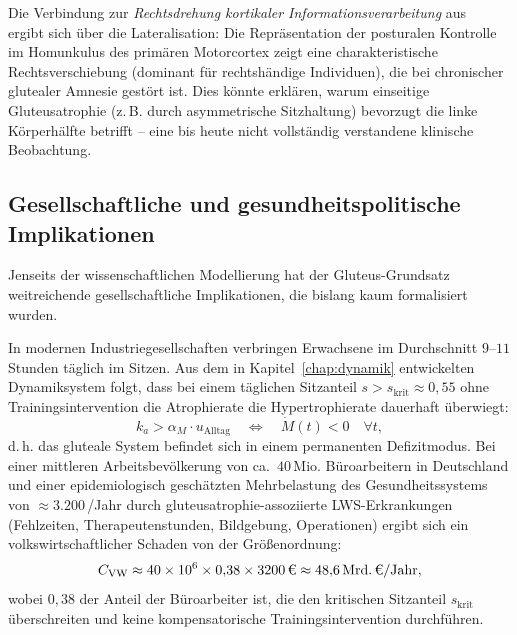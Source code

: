 ﻿\documentclass[12pt,a4paper]{report}
\theoremstyle{plain}
\theoremstyle{definition}
\theoremstyle{remark}
\newcommand{\euro}{\texteuro}    %
\begin{document}
	Die Verbindung zur \emph{Rechtsdrehung kortikaler Informationsverarbeitung}
	aus~\cite{epp2026wolke} ergibt sich über die Lateralisation:
	Die Repräsentation der posturalen Kontrolle im Homunkulus des
	primären Motorcortex zeigt eine charakteristische Rechtsverschiebung
	(dominant für rechtshändige Individuen), die bei chronischer
	glutealer Amnesie gestört ist. Dies könnte erklären, warum
	einseitige Gluteusatrophie (z.\,B. durch asymmetrische Sitzhaltung)
	bevorzugt die linke Körperhälfte betrifft -- eine bis heute nicht
	vollständig verstandene klinische Beobachtung.
	
	\subsection{Gesellschaftliche und gesundheitspolitische Implikationen}
	\label{subsec:gesellschaft}
	
	Jenseits der wissenschaftlichen Modellierung hat der Gluteus-Grundsatz
	weitreichende gesellschaftliche Implikationen, die bislang kaum formalisiert wurden.
	
	In modernen Industriegesellschaften verbringen Erwachsene im Durchschnitt
	$9$--$11$ Stunden täglich im Sitzen. Aus dem in Kapitel~\ref{chap:dynamik}
	entwickelten Dynamiksystem folgt, dass bei einem täglichen Sitzanteil
	$s > s_{\mathrm{krit}} \approx 0{,}55$ ohne Trainingsintervention
	die Atrophierate die Hypertrophierate dauerhaft überwiegt:
	\[
	k_a > \alpha_M \cdot u_\mathrm{Alltag} \quad \Longleftrightarrow \quad
	\dot{M}(t) < 0 \quad \forall t,
	\]
	d.\,h. das gluteale System befindet sich in einem permanenten Defizitmodus.
	Bei einer mittleren Arbeitsbevölkerung von ca.~$40\,\mathrm{Mio.}$
	Büroarbeitern in Deutschland und einer epidemiologisch geschätzten
	Mehrbelastung des Gesundheitssystems von $\approx 3.200$\,\euro{}/Jahr
	durch gluteusatrophie-assoziierte LWS-Erkrankungen (Fehlzeiten,
	Therapeutenstunden, Bildgebung, Operationen) ergibt sich ein
	volkswirtschaftlicher Schaden von der Größenordnung:
	\[
	C_{\mathrm{VW}} \approx 40 \times 10^6 \times 0{,}38 \times 3200\,\text{\euro}
	\approx 48{,}6\,\text{Mrd.}\,\text{\euro}/\text{Jahr},
	\]
	wobei $0{,}38$ der Anteil der Büroarbeiter ist, die den kritischen
	Sitzanteil $s_{\mathrm{krit}}$ überschreiten und keine kompensatorische
	Trainingsintervention durchführen.
	
\end{document}
